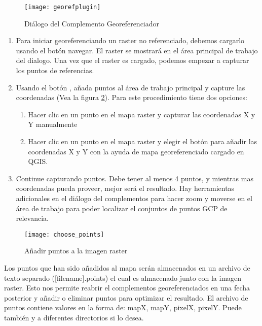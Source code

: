 \begin{figure}[ht]
\begin{center}
  \caption{Diálogo del Complemento Georeferenciador \nixcaption}\label{fig:georefplugin}\smallskip
  \texttt{[image: georefplugin]}
\end{center}
\end{figure}

\label{georeferencer_entering}

\begin{enumerate}
\item Para iniciar georeferenciando un raster no referenciado, debemos cargarlo usando el botón \browsebutton navegar. El raster se mostrará en el área principal de trabajo del dialogo. Una vez que el raster es cargado, podemos empezar a capturar los puntos de referencias.

\item Usando el botón , añada puntos al área de trabajo principal y capture las coordenadas (Vea la figura \ref{fig:choose_points}). Para este procedimiento tiene dos opciones:

\begin{enumerate}
\item Hacer clic en un punto en el mapa raster y capturar las coordenadas X y Y manualmente
\item Hacer clic en un punto en el mapa raster y elegir el botón  para añadir las coordenadas X y Y con la ayuda de mapa georeferenciado cargado en QGIS.
\end{enumerate}
\item Continue capturando puntos. Debe tener al menos 4 puntos, y mientras mas coordenadas pueda proveer, mejor será el resultado. Hay herramientas adicionales en el diálogo del complementos para hacer zoom y moverse en el área de trabajo para poder localizar el conjuntos de puntos GCP de relevancia.
\end{enumerate}

\begin{figure}[ht]
\begin{center}
  \caption{Añadir puntos a la imagen raster\nixcaption}\label{fig:choose_points}\smallskip
  \texttt{[image: choose\_points]}
\end{center}
\end{figure}

Los puntos que han sido añadidos al mapa serán almacenados en un archivo de texto separado ([filename].points) el cual es almacenado junto con la imagen raster. Esto nos permite reabrir el complementos georeferenciados en una fecha posterior y añadir o eliminar puntos para optimizar el resultado. El archivo de puntos contiene valores en la forma de: mapX, mapY, pixelX, pixelY. Puede también  y  a diferentes directorios si lo desea.

